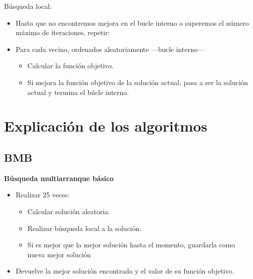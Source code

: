 Búsqueda local:
\begin{itemize}
\item Hasta que no encontremos mejora en el bucle interno o superemos el número máximo de iteraciones, repetir:
\item Para cada vecino, ordenados aleatoriamente ---bucle interno---
\begin{itemize}
\item Calcular la función objetivo.
\item Si mejora la función objetivo de la solución actual, pasa a ser la solución actual y termina el búcle interno.
\end{itemize} 
\end{itemize} 
\newpage
\newpage
\section{Explicación de los algoritmos}

\subsection{BMB}
\textbf{Búsqueda multiarranque básico}
\begin{itemize}
\item Realizar 25 veces:
\begin{itemize}
\item Calcular solución aleatoria.
\item Realizar búsqueda local a la solución.
\item Si es mejor que la mejor solución hasta el momento, guardarla como nueva mejor solución
\end{itemize} 
\item Devuelve la mejor solución encontrada y el valor de su función objetivo.
\end{itemize} 
\newpage

